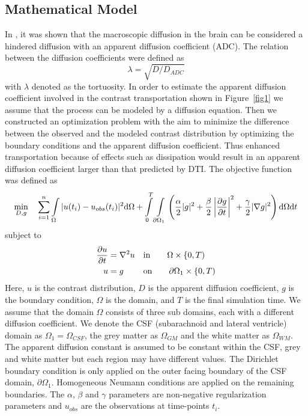 \documentclass[12pt,a4paper]{article}
\begin{document}
\subsection{Mathematical Model}
In \citet{sykova2008diffusion}, it was shown that the macroscopic diffusion in the brain can be considered a hindered diffusion with an apparent diffusion coefficient (ADC). The relation between the diffusion coefficients were defined as 
\begin{equation}
 \lambda =  \sqrt {D/D_{ADC}}
\label{tortuosity}
\end{equation}
with $\lambda$ denoted as the tortuosity.
In order to estimate the apparent diffusion coefficient involved in the contrast transportation shown in Figure~\ref{fig1} we assume that the process can be modeled by a diffusion equation. 
Then we constructed an optimization problem with the aim to minimize the difference between the observed and the modeled contrast distribution by optimizing the boundary conditions and the apparent diffusion coefficient. Thus enhanced transportation because of effects such as dissipation would result in an apparent diffusion coefficient larger than that predicted by DTI. The objective function was defined as 
\begin{equation}
\min_{D,g} \quad \sum\limits_{i=1}\sp{n} \int\limits_{\Omega} |u(t_i) - u_{obs}(t_i)|\sp{2} \mathrm{d}\Omega + \int\limits_{0}\sp{T} \int\limits_{\partial \Omega_1} \left( \frac{\alpha}{2} | g |\sp{2} + \frac{\beta}{2} \left| \frac{\partial g}{\partial t} \right|\sp{2} +  \frac{\gamma}{2}| \nabla g |\sp{2} \right) \mathrm{d}\Omega \mathrm{d}t  
\label{EQ::objf}
\end{equation}
subject to   
\begin{equation}
\begin{aligned}
\frac{\partial u}{\partial t} &=  \nabla\sp{2} u && \text{in} \qquad \Omega \times \left\lbrace 0 , T \right)  \\
u&=g && \text{on} \qquad \partial\Omega_1  \times \left\lbrace 0 , T \right) 
\end{aligned}
\label{Eq::PDE}
\end{equation}
Here, $u$ is the contrast distribution, $D$ is the apparent diffusion 
coefficient, $g$ is the boundary condition, $\Omega$ is the domain, and $T$ is the final simulation time. We assume that the domain $\Omega$ consists of three sub domains, each with a different diffusion coefficient. We denote the CSF (subarachnoid and lateral ventricle) domain as $\Omega_1=\Omega_{CSF}$, the grey matter as $\Omega_{GM}$ and the white matter as $\Omega_{WM}$. 
The apparent
diffusion constant is assumed to be constant within the CSF, grey and 
white matter but each region may have different values.  
The Dirichlet boundary condition is only applied on the outer facing boundary of the CSF domain, $\partial \Omega_1$. Homogeneous Neumann conditions are applied on the remaining boundaries.
The $\alpha$, $\beta$ and $\gamma$ parameters are non-negative regularization parameters 
and $u_{obs}$ are the observations at time-points $t_i$. 
\end{document}
